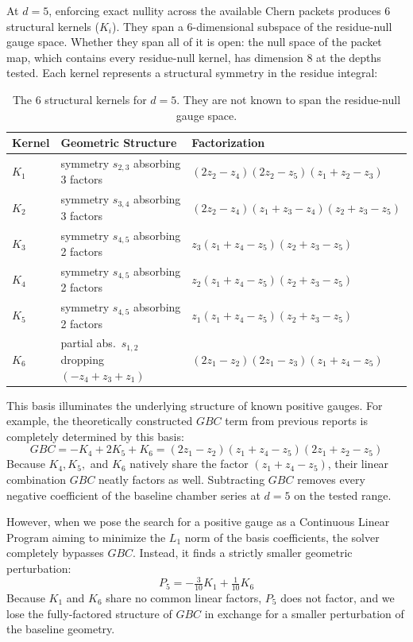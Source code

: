 \documentclass[11pt,a4paper]{article}
\theoremstyle{plain}
\theoremstyle{definition}
\theoremstyle{remark}
\begin{document}
At $d = 5$, enforcing exact nullity across the available Chern packets produces $6$ structural kernels ($K_i$). They span a $6$-dimensional subspace of the residue-null gauge space. Whether they span all of it is open: the null space of the packet map, which contains every residue-null kernel, has dimension $8$ at the depths tested. Each kernel represents a structural symmetry in the residue integral:
\begin{table}[ht]
\centering
\caption{The 6 structural kernels for $d=5$. They are not known to span the residue-null gauge space.}
\label{tab:d5_kernels}
\small
\begin{tabularx}{\textwidth}{@{}lLl@{}}
\toprule
 Kernel & Geometric Structure & Factorization \\
\midrule
 $K_1$ & symmetry $s_{2,3}$ absorbing 3 factors & $(2z_2 - z_4)(2z_2 - z_5)(z_1 + z_2 - z_3)$ \\
 $K_2$ & symmetry $s_{3,4}$ absorbing 3 factors & $(2z_2 - z_4)(z_1 + z_3 - z_4)(z_2 + z_3 - z_5)$ \\
 $K_3$ & symmetry $s_{4,5}$ absorbing 2 factors & $z_3(z_1 + z_4 - z_5)(z_2 + z_3 - z_5)$ \\
 $K_4$ & symmetry $s_{4,5}$ absorbing 2 factors & $z_2(z_1 + z_4 - z_5)(z_2 + z_3 - z_5)$ \\
 $K_5$ & symmetry $s_{4,5}$ absorbing 2 factors & $z_1(z_1 + z_4 - z_5)(z_2 + z_3 - z_5)$ \\
 $K_6$ & partial abs.\ $s_{1,2}$ dropping $(-z_4 + z_3 + z_1)$ & $(2z_1 - z_2)(2z_1 - z_3)(z_1 + z_4 - z_5)$ \\
\bottomrule
\end{tabularx}
\end{table}

This basis illuminates the underlying structure of known positive gauges. For example, the theoretically constructed $GBC$ term from previous reports is completely determined by this basis:
\[
  GBC = -K_4 + 2 K_5 + K_6 = (2z_1 - z_2)(z_1 + z_4 - z_5)(2z_1 + z_2 - z_5)
\]
Because $K_4, K_5,$ and $K_6$ natively share the factor $(z_1 + z_4 - z_5)$, their linear combination $GBC$ neatly factors as well. Subtracting $GBC$ removes every negative coefficient of the baseline chamber series at $d=5$ on the tested range. 

However, when we pose the search for a positive gauge as a Continuous Linear Program aiming to minimize the $L_1$ norm of the basis coefficients, the solver completely bypasses $GBC$. Instead, it finds a strictly smaller geometric perturbation:
\[
  P_5 = -\tfrac{3}{10} K_1 + \tfrac{1}{10} K_6
\]
Because $K_1$ and $K_6$ share no common linear factors, $P_5$ does not factor, and we lose the
fully-factored structure of $GBC$ in exchange for a smaller perturbation of the baseline geometry.
\end{document}
